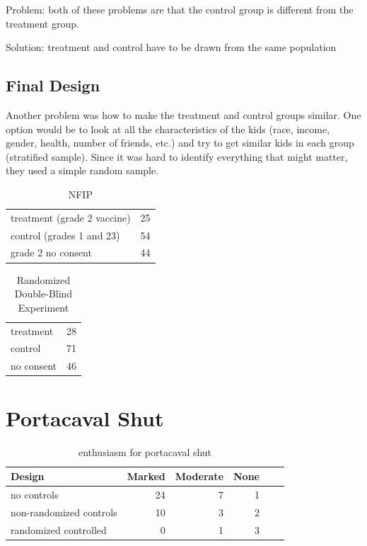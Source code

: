 \documentclass[landscape]{exam}
\begin{document}
  Problem: both of these problems are that the control group is different from the
  treatment group.

  Solution: treatment and control have to be drawn from the same population

  \subsection{Final Design}
  Another problem was how to make the treatment and control groups similar.  One
  option would be to look at all the characteristics of the kids (race, income,
  gender, health, number of friends, etc.) and try to get similar kids in each
  group (stratified sample).  Since it was hard to identify everything that
  might matter, they used a simple random sample.

  \begin{table}
    \centering
    \begin{tabular}{lr}
      \toprule
      treatment (grade 2 vaccine) & 25 \\
      control (grades 1 and 23)   & 54 \\
      grade 2 no consent          & 44 \\
      \bottomrule
    \end{tabular}
    \caption{NFIP}\label{tab:polio.1}
  \end{table}

  \begin{table}
    \centering
    \begin{tabular}{lr}
      \toprule
      treatment  & 28 \\
      control    & 71 \\
      no consent & 46 \\
      \bottomrule
    \end{tabular}
    \caption{Randomized Double-Blind Experiment}\label{tab:polio.1}
  \end{table}


  \section{Portacaval Shut}
  \begin{table}
    \centering
    \begin{tabular}{lrrrrr}
      \toprule
      Design                  & Marked & Moderate & None \\
      \midrule
      no controls             & 24     & 7        & 1   \\
      non-randomized controls & 10     & 3        & 2   \\
      randomized controlled   & 0      & 1        & 3   \\
      \bottomrule
    \end{tabular}
    \caption{enthusiasm for portacaval shut}\label{tab:shunt}
  \end{table}
\end{document}
